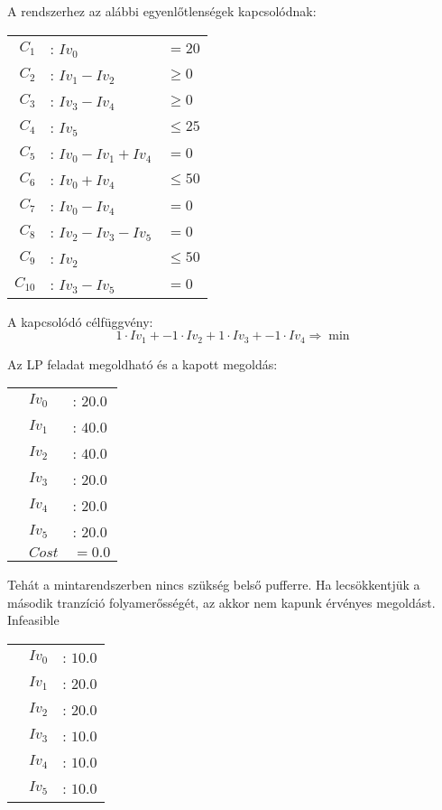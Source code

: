 A rendszerhez az alábbi egyenlőtlenségek kapcsolódnak:

\begin{center}
\begin{tabular}{rll}
$C_1$ &: $Iv_0$ &$= 20$ \\
$C_2$ &: $Iv_1 - Iv_2$ &$\geq 0$\\
$C_3$ &: $Iv_3 - Iv_4$ &$\geq 0$\\
$C_4$ &: $Iv_5$ &$\leq 25$\\
$C_5$ &: $Iv_0 - Iv_1 + Iv_4$ &$= 0$\\
$C_6$ &: $Iv_0 + Iv_4 $&$\leq 50$\\
$C_7$ &: $Iv_0 - Iv_4 $&$= 0$\\
$C_8$ &: $Iv_2 - Iv_3 - Iv_5$&$= 0$\\
$C_9$ &: $Iv_2 $&$\leq 50$\\
$C_{10}$ &: $Iv_3 - Iv_5 $&$= 0$
\end{tabular}
\end{center}

A kapcsolódó célfüggvény:
$$1\cdot Iv_1 + -1\cdot Iv_2 + 1\cdot Iv_3 + -1\cdot Iv_4\Rightarrow \min$$

Az LP feladat megoldható és a kapott megoldás:
\begin{center}
\begin{tabular}{rll}
&$Iv_0$ &: $20.0$\\
&$Iv_1$ &: $40.0$\\
&$Iv_2$ &: $40.0$\\
&$Iv_3$ &: $20.0$\\
&$Iv_4$ &: $20.0$\\
&$Iv_5$ &: $20.0$\\
&$Cost$ & $= 0.0$
\end{tabular}
\end{center}
Tehát a mintarendszerben nincs szükség belső pufferre. 
Ha lecsökkentjük a második tranzíció folyamerősségét, az akkor nem kapunk érvényes megoldást. \\
Infeasible
\begin{center}
\begin{tabular}{rll}
&$Iv_0$ &: $10.0$\\
&$Iv_1$ &: $20.0$\\
&$Iv_2$ &: $20.0$\\
&$Iv_3$ &: $10.0$\\
&$Iv_4$ &: $10.0$\\
&$Iv_5$ &: $10.0$
\end{tabular}
\end{center}

